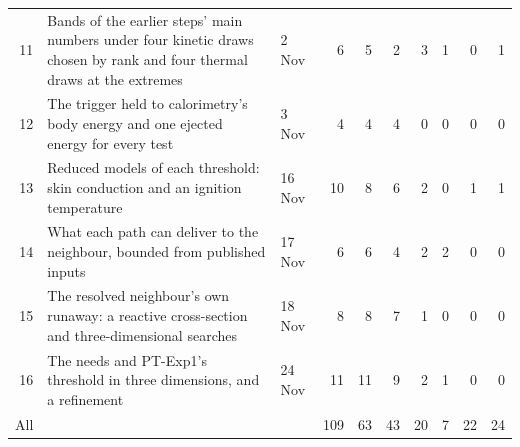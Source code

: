 \begin{table}[!htbp]
\begin{tabular}{rp{}lrrrrrrr}
11 & Bands of the earlier steps' main numbers under four kinetic draws chosen by rank and four thermal draws at the extremes & 2 Nov & 6 & 5 & 2 & 3 & 1 & 0 & 1 \\
12 & The trigger held to calorimetry's body energy and one ejected energy for every test & 3 Nov & 4 & 4 & 4 & 0 & 0 & 0 & 0 \\
13 & Reduced models of each threshold: skin conduction and an ignition temperature & 16 Nov & 10 & 8 & 6 & 2 & 0 & 1 & 1 \\
14 & What each path can deliver to the neighbour, bounded from published inputs & 17 Nov & 6 & 6 & 4 & 2 & 2 & 0 & 0 \\
15 & The resolved neighbour's own runaway: a reactive cross-section and three-dimensional searches & 18 Nov & 8 & 8 & 7 & 1 & 0 & 0 & 0 \\
16 & The needs and PT-Exp1's threshold in three dimensions, and a refinement & 24 Nov & 11 & 11 & 9 & 2 & 1 & 0 & 0 \\
\midrule
All & & & 109 & 63 & 43 & 20 & 7 & 22 & 24 \\
\bottomrule
\end{tabular}
\end{table}
